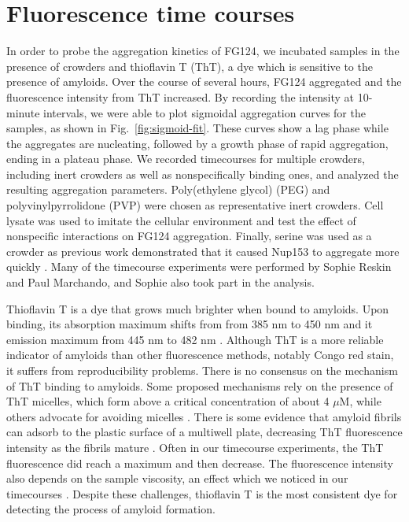 \section{Fluorescence time courses}

In order to probe the aggregation kinetics of FG124, we incubated samples in the presence of crowders and thioflavin T (ThT), a dye which is sensitive to the presence of amyloids.  Over the course of several hours, FG124 aggregated and the fluorescence intensity from ThT increased.  By recording the intensity at 10-minute intervals, we were able to plot sigmoidal aggregation curves for the samples, as shown in Fig.~\ref{fig:sigmoid-fit}.  These curves show a lag phase while the aggregates are nucleating, followed by a growth phase of rapid aggregation, ending in a plateau phase.  We recorded timecourses for multiple crowders, including inert crowders as well as nonspecifically binding ones, and analyzed the resulting aggregation parameters.  Poly(ethylene glycol) (PEG) and polyvinylpyrrolidone (PVP) were chosen as representative inert crowders.  Cell lysate was used to imitate the cellular environment and test the effect of nonspecific interactions on FG124 aggregation.  Finally, serine was used as a crowder as previous work demonstrated that it caused Nup153 to aggregate more quickly \cite{milles13}.  Many of the timecourse experiments were performed by Sophie Reskin and Paul Marchando, and Sophie also took part in the analysis.

Thioflavin T is a dye that grows much brighter when bound to amyloids.  Upon binding, its absorption maximum shifts from from 385 nm to 450 nm and it emission maximum from 445 nm to 482 nm \cite{picken12}.  Although ThT is a more reliable indicator of amyloids than other fluorescence methods, notably Congo red stain, it suffers from reproducibility problems.  There is no consensus on the mechanism of ThT binding to amyloids.  Some proposed mechanisms rely on the presence of ThT micelles, which form above a critical concentration of about 4 $\mu$M, while others advocate for avoiding micelles \cite{khurana05, groenning09}.  There is some evidence that amyloid fibrils can adsorb to the plastic surface of a multiwell plate, decreasing ThT fluorescence intensity as the fibrils mature \cite{murray13}.  Often in our timecourse experiments, the ThT fluorescence did reach a maximum and then decrease.  The fluorescence intensity also depends on the sample viscosity, an effect which we noticed in our timecourses \cite{sulatskaya10}.  Despite these challenges, thioflavin T is the most consistent dye for detecting the process of amyloid formation.

